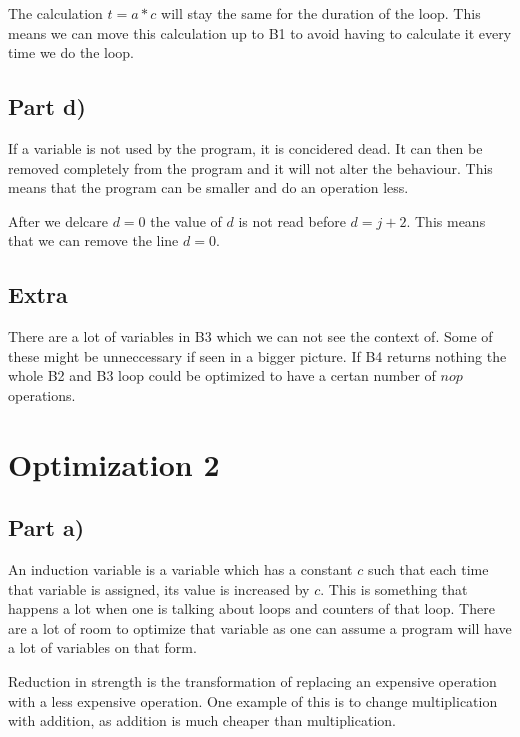 \documentclass[paper=a4, fontsize=11pt]{scrartcl} %
\numberwithin{equation}{section} %
\numberwithin{figure}{section} %
\numberwithin{table}{section} %
\begin{document}
The calculation $t = a * c$ will stay the same for the duration of the loop.
This means we can move this calculation up to B1 to avoid having to calculate it every time we do the loop.

\subsection{Part d)}
If a variable is not used by the program, it is concidered dead.
It can then be removed completely from the program and it will not alter the behaviour.
This means that the program can be smaller and do an operation less.

After we delcare $ d = 0 $ the value of $d$ is not read before $ d = j + 2 $.
This means that we can remove the line $ d = 0 $.

\subsection{Extra}
There are a lot of variables in B3 which we can not see the context of.
Some of these might be unneccessary if seen in a bigger picture.
If B4 returns nothing the whole B2 and B3 loop could be optimized to have a certan number of $nop$ operations.

\section{Optimization 2}

\subsection{Part a)}
An induction variable is a variable which has a constant $c$ such that each time that variable is assigned, its value is increased by $c$.
This is something that happens a lot when one is talking about loops and counters of that loop.
There are a lot of room to optimize that variable as one can assume a program will have a lot of variables on that form.

Reduction in strength is the transformation of replacing an expensive operation with a less expensive operation.
One example of this is to change multiplication with addition, as addition is much cheaper than multiplication.
\end{document}
